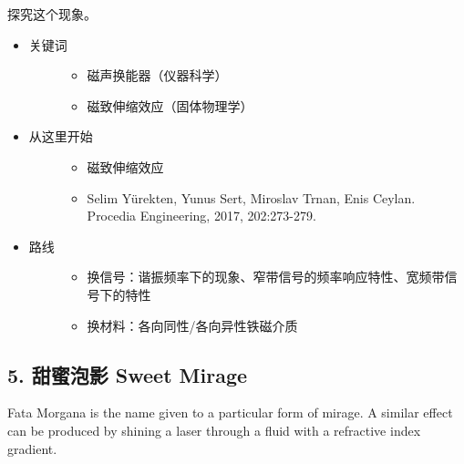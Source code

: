 \documentclass[a4paper,10pt,english]{sphinxmanual}
\begin{document}
探究这个现象。
\begin{itemize}
\item {} \begin{description}
\item[{关键词}] \leavevmode\begin{itemize}
\item {} 
磁声换能器（仪器科学）

\item {} 
磁致伸缩效应（固体物理学）

\end{itemize}

\end{description}

\item {} \begin{description}
\item[{从这里开始}] \leavevmode\begin{itemize}
\item {} 
磁致伸缩效应 

\item {} 
Selim Yürekten, Yunus Sert, Miroslav Trnan, Enis Ceylan.  Procedia Engineering, 2017, 202:273-279.

\end{itemize}

\end{description}

\item {} \begin{description}
\item[{路线}] \leavevmode\begin{itemize}
\item {} 
换信号：谐振频率下的现象、窄带信号的频率响应特性、宽频带信号下的特性

\item {} 
换材料：各向同性/各向异性铁磁介质

\end{itemize}

\end{description}

\end{itemize}


\subsection{5. 甜蜜泡影 Sweet Mirage}
\label{\detokenize{7. Appendix:sweet-mirage}}
Fata Morgana is the name given to a particular form of mirage. A similar effect can be produced by shining a laser through a fluid with a refractive index gradient.
\end{document}
